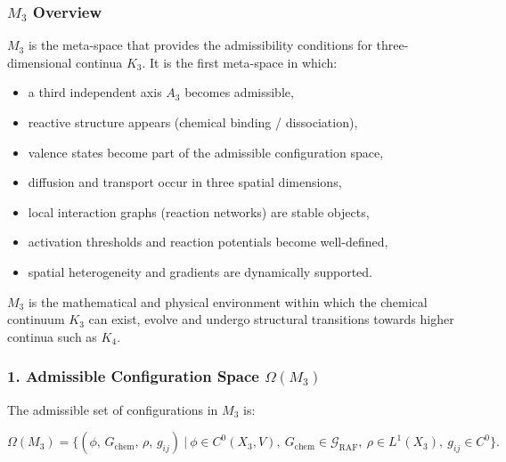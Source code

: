

\subsubsection{\texorpdfstring{$M_3$}{M_3} Overview}
\label{sec:m3-overview}

$M_3$ is the meta-space that provides the admissibility conditions for
three-dimensional continua $K_3$.
It is the first meta-space in which:

\begin{itemize}
    \item a third independent axis $A_3$ becomes admissible,
    \item reactive structure appears (chemical binding / dissociation),
    \item valence states become part of the admissible configuration space,
    \item diffusion and transport occur in three spatial dimensions,
    \item local interaction graphs (reaction networks) are stable objects,
    \item activation thresholds and reaction potentials become well-defined,
    \item spatial heterogeneity and gradients are dynamically supported.
\end{itemize}

$M_3$ is the mathematical and physical environment within which
the chemical continuum $K_3$ can exist, evolve and undergo structural transitions
towards higher continua such as $K_4$.

\subsubsection*{1. Admissible Configuration Space \texorpdfstring{$\Omega(M_3)$}{\Omega(M_3)}}

The admissible set of configurations in $M_3$ is:

\[
\Omega(M_3)
=
\Big\{
(\phi,\, G_{\mathrm{chem}},\, \rho,\, g_{ij}) \ \Big|\
\phi \in C^{0}(X_3, V),\
G_{\mathrm{chem}} \in \mathcal{G}_{\mathrm{RAF}},\
\rho \in L^1(X_3),\
g_{ij}\in C^{0}
\Big\}.
\]

